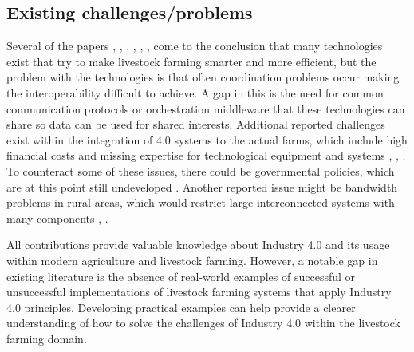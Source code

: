 \subsection{Existing challenges/problems}
Several of the papers \cite{pr7010036}, \cite{KRUIZE201612}, \cite{app122412844}, \cite{agronomy12030750}, \cite{s22124319}, \cite{jepsen2021analysis}, \cite{ZHANG2021127712} come to the conclusion that many technologies exist that try to make livestock farming smarter and more efficient, but the problem with the technologies is that often coordination problems occur making the interoperability difficult to achieve. A gap in this is the need for common communication protocols or orchestration middleware that these technologies can share so data can be used for shared interests.
Additional reported challenges exist within the integration of 4.0 systems to the actual farms, which include high financial costs and missing expertise for technological equipment and systems \cite{app122412844}, \cite{s22124319}, \cite{ZHANG2021127712}. To counteract some of these issues, there could be governmental policies, which are at this point still undeveloped \cite{pr7010036}.
Another reported issue might be bandwidth problems in rural areas, which would restrict large interconnected systems with many components \cite{pr7010036}, \cite{s22124319}.
\newline

All contributions provide valuable knowledge about Industry 4.0 and its usage within modern agriculture and livestock farming. However, a notable gap in existing literature is the absence of real-world examples of successful or unsuccessful implementations of livestock farming systems that apply Industry 4.0 principles. Developing practical examples can help provide a clearer understanding of how to solve the challenges of Industry 4.0 within the livestock farming domain.